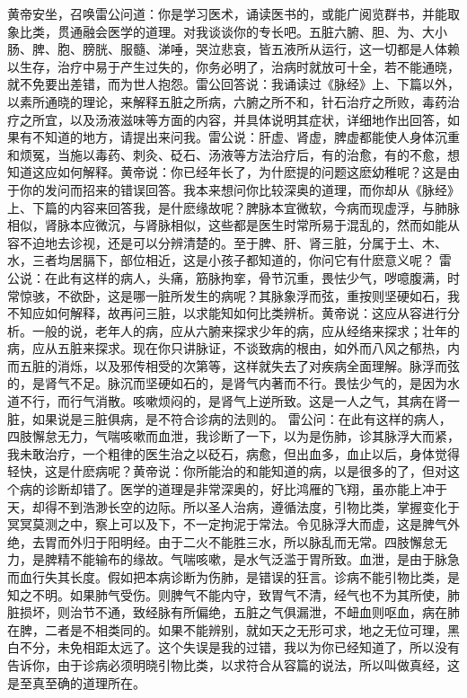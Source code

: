 \documentclass[a4paper,12pt,UTF8,twoside]{ctexbook}
\begin{document}
黄帝安坐，召唤雷公问道：你是学习医术，诵读医书的，或能广阅览群书，并能取象比类，贯通融会医学的道理。对我谈谈你的专长吧。五脏六腑、胆、为、大小肠、脾、胞、膀胱、服髓、涕唾，哭泣悲哀，皆五液所从运行，这一切都是人体赖以生存，治疗中易于产生过失的，你务必明了，治病时就放可十全，若不能通晓，就不免要出差错，而为世人抱怨。雷公回答说：我诵读过《脉经》上、下篇以外，以素所通晓的理论，来解释五脏之所病，六腑之所不和，针石治疗之所败，毒药治疗之所宜，以及汤液滋味等方面的内容，并具体说明其症状，详细地作出回答，如果有不知道的地方，请提出来问我。雷公说：肝虚、肾虚，脾虚都能使人身体沉重和烦冤，当施以毒药、刺灸、砭石、汤液等方法治疗后，有的治愈，有的不愈，想知道这应如何解释。黄帝说：你已经年长了，为什麽提的问题这麽幼稚呢？这是由于你的发问而招来的错误回答。我本来想问你比较深奥的道理，而你却从《脉经》上、下篇的内容来回答我，是什麽缘故呢？脾脉本宜微软，今病而现虚浮，与肺脉相似，肾脉本应微沉，与肾脉相似，这些都是医生时常所易于混乱的，然而如能从容不迫地去诊视，还是可以分辨清楚的。至于脾、肝、肾三脏，分属于土、木、水，三者均居膈下，部位相近，这是小孩子都知道的，你问它有什麽意义呢？
雷公说：在此有这样的病人，头痛，筋脉拘挛，骨节沉重，畏怯少气，哕噫腹满，时常惊骇，不欲卧，这是哪一脏所发生的病呢？其脉象浮而弦，重按则坚硬如石，我不知应如何解释，故再问三脏，以求能知如何比类辨析。黄帝说：这应从容进行分析。一般的说，老年人的病，应从六腑来探求少年的病，应从经络来探求；壮年的病，应从五脏来探求。现在你只讲脉证，不谈致病的根由，如外而八风之郁热，内而五脏的消烁，以及邪传相受的次第等，这样就失去了对疾病全面理解。脉浮而弦的，是肾气不足。脉沉而坚硬如石的，是肾气内著而不行。畏怯少气的，是因为水道不行，而行气消散。咳嗽烦闷的，是肾气上逆所致。这是一人之气，其病在肾一脏，如果说是三脏俱病，是不符合诊病的法则的。
雷公问：在此有这样的病人，四肢懈怠无力，气喘咳嗽而血泄，我诊断了一下，以为是伤肺，诊其脉浮大而紧，我未敢治疗，一个粗律的医生治之以砭石，病愈，但出血多，血止以后，身体觉得轻快，这是什麽病呢？黄帝说：你所能治的和能知道的病，以是很多的了，但对这个病的诊断却错了。医学的道理是非常深奥的，好比鸿雁的飞翔，虽亦能上冲于天，却得不到浩渺长空的边际。所以圣人治病，遵循法度，引物比类，掌握变化于冥冥莫测之中，察上可以及下，不一定拘泥于常法。令见脉浮大而虚，这是脾气外绝，去胃而外归于阳明经。由于二火不能胜三水，所以脉乱而无常。四肢懈怠无力，是脾精不能输布的缘故。气喘咳嗽，是水气泛滥于胃所致。血泄，是由于脉急而血行失其长度。假如把本病诊断为伤肺，是错误的狂言。诊病不能引物比类，是知之不明。如果肺气受伤。则脾气不能内守，致胃气不清，经气也不为其所使，肺脏损坏，则治节不通，致经脉有所偏绝，五脏之气俱漏泄，不衄血则呕血，病在肺在脾，二者是不相类同的。如果不能辨别，就如天之无形可求，地之无位可理，黑白不分，未免相距太远了。这个失误是我的过错，我以为你已经知道了，所以没有告诉你，由于诊病必须明晓引物比类，以求符合从容篇的说法，所以叫做真经，这是至真至确的道理所在。
\end{document}
